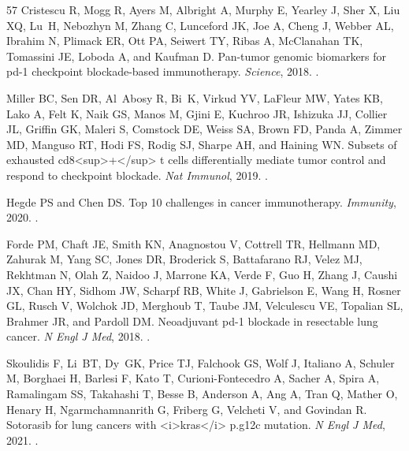 \documentclass[11pt]{article}
\begin{document}
\begin{thebibliography}{57}
Cristescu R, Mogg R, Ayers M, Albright A, Murphy E, Yearley J, Sher X, Liu XQ,
  Lu~H, Nebozhyn M, Zhang C, Lunceford JK, Joe A, Cheng J, Webber AL, Ibrahim
  N, Plimack ER, Ott PA, Seiwert TY, Ribas A, McClanahan TK, Tomassini JE,
  Loboda A, and Kaufman D.
\newblock Pan-tumor genomic biomarkers for pd-1 checkpoint blockade-based
  immunotherapy.
\newblock \emph{Science}, 2018.
\newblock {}.

Miller BC, Sen DR, Al~Abosy R, Bi~K, Virkud YV, LaFleur MW, Yates KB, Lako A,
  Felt K, Naik GS, Manos M, Gjini E, Kuchroo JR, Ishizuka JJ, Collier JL,
  Griffin GK, Maleri S, Comstock DE, Weiss SA, Brown FD, Panda A, Zimmer MD,
  Manguso RT, Hodi FS, Rodig SJ, Sharpe AH, and Haining WN.
\newblock Subsets of exhausted cd8<sup>+</sup> t cells differentially mediate
  tumor control and respond to checkpoint blockade.
\newblock \emph{Nat Immunol}, 2019.
\newblock {}.

Hegde PS and Chen DS.
\newblock Top 10 challenges in cancer immunotherapy.
\newblock \emph{Immunity}, 2020.
\newblock {}.

Forde PM, Chaft JE, Smith KN, Anagnostou V, Cottrell TR, Hellmann MD, Zahurak
  M, Yang SC, Jones DR, Broderick S, Battafarano RJ, Velez MJ, Rekhtman N, Olah
  Z, Naidoo J, Marrone KA, Verde F, Guo H, Zhang J, Caushi JX, Chan HY, Sidhom
  JW, Scharpf RB, White J, Gabrielson E, Wang H, Rosner GL, Rusch V, Wolchok
  JD, Merghoub T, Taube JM, Velculescu VE, Topalian SL, Brahmer JR, and Pardoll
  DM.
\newblock Neoadjuvant pd-1 blockade in resectable lung cancer.
\newblock \emph{N Engl J Med}, 2018.
\newblock {}.

Skoulidis F, Li~BT, Dy~GK, Price TJ, Falchook GS, Wolf J, Italiano A, Schuler
  M, Borghaei H, Barlesi F, Kato T, Curioni-Fontecedro A, Sacher A, Spira A,
  Ramalingam SS, Takahashi T, Besse B, Anderson A, Ang A, Tran Q, Mather O,
  Henary H, Ngarmchamnanrith G, Friberg G, Velcheti V, and Govindan R.
\newblock Sotorasib for lung cancers with <i>kras</i> p.g12c mutation.
\newblock \emph{N Engl J Med}, 2021.
\newblock {}.


\end{thebibliography}
\end{document}
